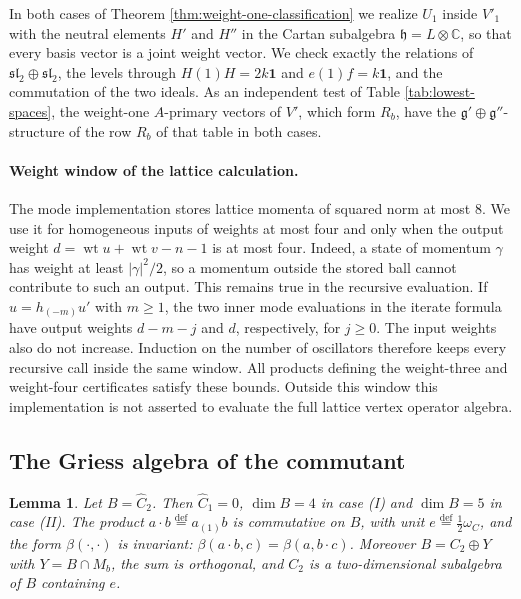 \documentclass[leqno]{article}
\newcommand{\Cbb}{\ensuremath{\mathbb{C}}}
\renewcommand{\geq}{\ensuremath{\geqslant}}
\newcommand{\ot}{\otimes}
\newcommand{\ov}{\overset}
\newtheorem{lemma}[thm]{Lemma}
\numberwithin{equation}{section}
\begin{document}
In both cases of Theorem \ref{thm:weight-one-classification} we realize $U_1$ inside $V'_1$ with the neutral elements $H'$ and $H''$ in the Cartan subalgebra $\mathfrak h = L \ot \Cbb$, so that every basis vector is a joint weight vector. We check exactly the relations of $\mathfrak{sl}_2 \oplus \mathfrak{sl}_2$, the levels through $H(1)H = 2k\mathbf 1$ and $e(1)f = k\mathbf 1$, and the commutation of the two ideals. As an independent test of Table \ref{tab:lowest-spaces}, the weight-one $A$-primary vectors of $V'$, which form $R_b$, have the $\mathfrak g' \oplus \mathfrak g''$-structure of the row $R_b$ of that table in both cases.

\paragraph{Weight window of the lattice calculation.}
\label{par:lattice-weight-window}
The mode implementation stores lattice momenta of squared norm at most $8$. We use it for homogeneous inputs of weights at most four and only when the output weight $d = \operatorname{wt}u+\operatorname{wt}v-n-1$ is at most four. Indeed, a state of momentum $\gamma$ has weight at least $|\gamma|^2/2$, so a momentum outside the stored ball cannot contribute to such an output. This remains true in the recursive evaluation. If $u = h_{(-m)}u'$ with $m \geq 1$, the two inner mode evaluations in the iterate formula have output weights $d-m-j$ and $d$, respectively, for $j \geq 0$. The input weights also do not increase. Induction on the number of oscillators therefore keeps every recursive call inside the same window. All products defining the weight-three and weight-four certificates satisfy these bounds. Outside this window this implementation is not asserted to evaluate the full lattice vertex operator algebra.

\subsection{The Griess algebra of the commutant}

\begin{lemma}
\label{lem:griess-B}
Let $B = \widehat C_2$. Then $\widehat C_1 = 0$, $\dim B = 4$ in case (I) and $\dim B = 5$ in case (II). The product $a \cdot b \ov{\mathrm{def}}{=} a_{(1)}b$ is commutative on $B$, with unit $e \ov{\mathrm{def}}{=} \frac{1}{2}\omega_C$, and the form $\beta(\cdot,\cdot)$ is invariant: $\beta(a \cdot b,c) = \beta(a,b \cdot c)$. Moreover $B = C_2 \oplus Y$ with $Y = B \cap M_b$, the sum is orthogonal, and $C_2$ is a two-dimensional subalgebra of $B$ containing $e$.
\end{lemma}
\end{document}
